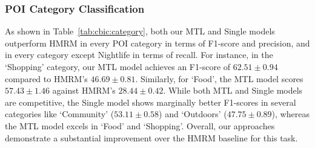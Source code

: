 \subsubsection{POI Category Classification}
As shown in Table~\ref{tab:cbic:category}, both our MTL and Single models outperform HMRM \cite{chen2020modeling} in every POI category in terms of F1-score and precision, and in every category except Nightlife in terms of recall. For instance, in the `Shopping' category, our MTL model achieves an F1-score of $62.51 \pm 0.94$ compared to HMRM's $46.69 \pm 0.81$. Similarly, for `Food', the MTL model scores $57.43 \pm 1.46$ against HMRM's $28.44 \pm 0.42$. While both MTL and Single models are competitive, the Single model shows marginally better F1-scores in several categories like `Community' ($53.11 \pm 0.58$) and `Outdoors' ($47.75 \pm 0.89$), whereas the MTL model excels in `Food' and `Shopping'. Overall, our approaches demonstrate a substantial improvement over the HMRM baseline for this task.



